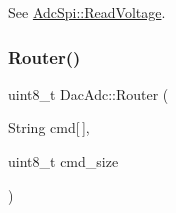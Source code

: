 See \mbox{\hyperlink{classAdcSpi_ace8264acfedb357986afa5f611eff3ee}{Adc\+Spi\+::\+Read\+Voltage}}. \mbox{\label{classDacAdc_af88ff87151dd01c8aa2646a84e26e7aa}} 
\subsubsection{\texorpdfstring{Router()}{Router()}}
{\footnotesize\ttfamily uint8\+\_\+t Dac\+Adc\+::\+Router (\begin{DoxyParamCaption}\item[{String}]{cmd\mbox{[}$\,$\mbox{]},  }\item[{uint8\+\_\+t}]{cmd\+\_\+size }\end{DoxyParamCaption})}

